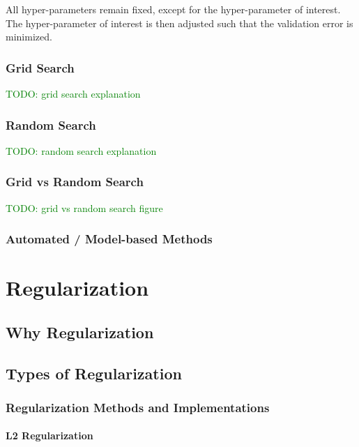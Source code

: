 All hyper-parameters remain fixed, except for the hyper-parameter of interest. The hyper-parameter of interest is then adjusted such that the validation error is minimized.

\subsubsection{Grid Search}

\textcolor{green}{TODO: grid search explanation}

\subsubsection{Random Search}

\textcolor{green}{TODO: random search explanation}

\subsubsection{Grid vs Random Search}

\textcolor{green}{TODO: grid vs random search figure}

\subsubsection{Automated / Model-based Methods}


\section{Regularization}

\subsection{Why Regularization}

\subsection{Types of Regularization}

\subsubsection{Regularization Methods and Implementations}

\paragraph{L2 Regularization}

